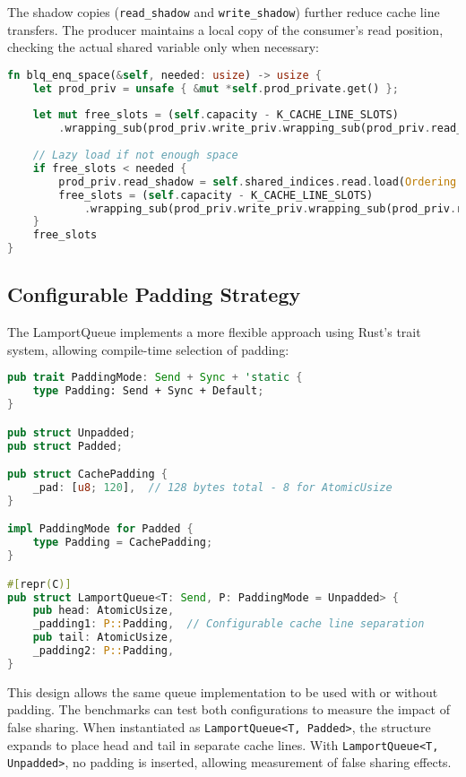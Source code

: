 The shadow copies (\texttt{read\_shadow} and \texttt{write\_shadow}) further reduce cache line transfers. The producer maintains a local copy of the consumer's read position, checking the actual shared variable only when necessary:

\begin{lstlisting}[language=Rust, style=boxed, caption={Shadow variables to reduce cache line transfers}, label={lst:shadow-variables}]
fn blq_enq_space(&self, needed: usize) -> usize {
    let prod_priv = unsafe { &mut *self.prod_private.get() };
    
    let mut free_slots = (self.capacity - K_CACHE_LINE_SLOTS)
        .wrapping_sub(prod_priv.write_priv.wrapping_sub(prod_priv.read_shadow));
    
    // Lazy load if not enough space
    if free_slots < needed {
        prod_priv.read_shadow = self.shared_indices.read.load(Ordering::Acquire);
        free_slots = (self.capacity - K_CACHE_LINE_SLOTS)
            .wrapping_sub(prod_priv.write_priv.wrapping_sub(prod_priv.read_shadow));
    }
    free_slots
}
\end{lstlisting}

\subsection{Configurable Padding Strategy}

The LamportQueue implements a more flexible approach using Rust's trait system, allowing compile-time selection of padding:

\begin{lstlisting}[language=Rust, style=boxed, caption={Trait-based configurable padding}, label={lst:configurable-padding}]
pub trait PaddingMode: Send + Sync + 'static {
    type Padding: Send + Sync + Default;
}

pub struct Unpadded;
pub struct Padded;

pub struct CachePadding {
    _pad: [u8; 120],  // 128 bytes total - 8 for AtomicUsize
}

impl PaddingMode for Padded {
    type Padding = CachePadding;
}

#[repr(C)]
pub struct LamportQueue<T: Send, P: PaddingMode = Unpadded> {
    pub head: AtomicUsize,
    _padding1: P::Padding,  // Configurable cache line separation
    pub tail: AtomicUsize,
    _padding2: P::Padding,
}
\end{lstlisting}

This design allows the same queue implementation to be used with or without padding. The benchmarks can test both configurations to measure the impact of false sharing. When instantiated as \texttt{LamportQueue<T, Padded>}, the structure expands to place head and tail in separate cache lines. With \texttt{LamportQueue<T, Unpadded>}, no padding is inserted, allowing measurement of false sharing effects.

